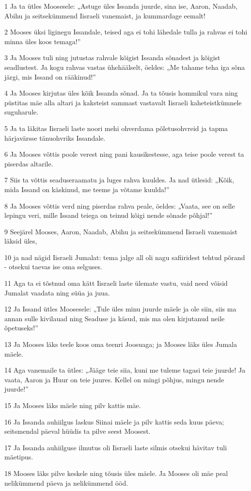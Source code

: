 \par 1 Ja ta ütles Moosesele: „Astuge üles Issanda juurde, sina ise, Aaron, Naadab, Abihu ja seitsekümmend Iisraeli vanemaist, ja kummardage eemalt!
\par 2 Mooses üksi liginegu Issandale, teised aga ei tohi lähedale tulla ja rahvas ei tohi minna üles koos temaga!”
\par 3 Ja Mooses tuli ning jutustas rahvale kõigist Issanda sõnadest ja kõigist seadlustest. Ja kogu rahvas vastas ühehäälselt, öeldes: „Me tahame teha iga sõna järgi, mis Issand on rääkinud!”
\par 4 Ja Mooses kirjutas üles kõik Issanda sõnad. Ja ta tõusis hommikul vara ning püstitas mäe alla altari ja kaksteist sammast vastavalt Iisraeli kaheteistkümnele suguharule.
\par 5 Ja ta läkitas Iisraeli laste noori mehi ohverdama põletusohvreid ja tapma härjavärsse tänuohvriks Issandale.
\par 6 Ja Mooses võttis poole verest ning pani kausikestesse, aga teise poole verest ta piserdas altarile.
\par 7 Siis ta võttis seaduseraamatu ja luges rahva kuuldes. Ja nad ütlesid: „Kõik, mida Issand on käskinud, me teeme ja võtame kuulda!”
\par 8 Ja Mooses võttis verd ning piserdas rahva peale, öeldes: „Vaata, see on selle lepingu veri, mille Issand teiega on teinud kõigi nende sõnade põhjal!”
\par 9 Seejärel Mooses, Aaron, Naadab, Abihu ja seitsekümmend Iisraeli vanemaist läksid üles,
\par 10 ja nad nägid Iisraeli Jumalat: tema jalge all oli nagu safiiridest tehtud põrand - otsekui taevas ise oma selguses.
\par 11 Aga ta ei tõstnud oma kätt Iisraeli laste ülemate vastu, vaid need võisid Jumalat vaadata ning süüa ja juua.
\par 12 Ja Issand ütles Moosesele: „Tule üles minu juurde mäele ja ole siin, siis ma annan sulle kivilauad ning Seaduse ja käsud, mis ma olen kirjutanud neile õpetuseks!”
\par 13 Ja Mooses läks teele koos oma teenri Joosuaga; ja Mooses läks üles Jumala mäele.
\par 14 Aga vanemaile ta ütles: „Jääge teie siia, kuni me tuleme tagasi teie juurde! Ja vaata, Aaron ja Huur on teie juures. Kellel on mingi põhjus, mingu nende juurde!”
\par 15 Ja Mooses läks mäele ning pilv kattis mäe.
\par 16 Ja Issanda auhiilgus laskus Siinai mäele ja pilv kattis seda kuus päeva; seitsmendal päeval hüüdis ta pilve seest Moosest.
\par 17 Ja Issanda auhiilguse ilmutus oli Iisraeli laste silmis otsekui hävitav tuli mäetipus.
\par 18 Mooses läks pilve keskele ning tõusis üles mäele. Ja Mooses oli mäe peal nelikümmend päeva ja nelikümmend ööd.

